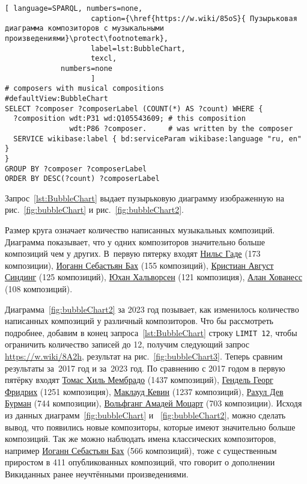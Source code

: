 \begin{lstlisting}[ language=SPARQL, numbers=none,
                    caption={\href{https://w.wiki/85oS}{ Пузырьковая диаграмма композиторов с музыкальными произведениями}\protect\footnotemark},
                    label=lst:BubbleChart,
                    texcl,
	         numbers=none
                    ]
# composers with musical compositions
#defaultView:BubbleChart
SELECT ?composer ?composerLabel (COUNT(*) AS ?count) WHERE {
  ?composition wdt:P31 wd:Q105543609; # this composition
               wdt:P86 ?composer.     # was written by the composer
  SERVICE wikibase:label { bd:serviceParam wikibase:language "ru, en" }
}
GROUP BY ?composer ?composerLabel
ORDER BY DESC(?count) ?composerLabel
\end{lstlisting}%

Запрос~\ref{lst:BubbleChart} выдает пузырьковую диаграмму изображенную на рис.~\ref{fig:bubbleChart} и рис.~\ref{fig:bubbleChart2}.

Размер круга означает количество написанных музыкальных композиций. Диаграмма показывает, что у одних композиторов значительно больше композиций чем у других. В~первую пятерку входят \href{https://ru.wikipedia.org/wiki/Гаде,_Нильс}{Нильс Гаде} (\num{173} композиции), \href{https://ru.wikipedia.org/wiki/Бах,_Иоганн_Себастьян}{Иоганн Себастьян Бах} (\num{155} композиций), \href{https://ru.wikipedia.org/wiki/Синдинг,_Кристиан_Август}{Кристиан Август Синдинг} (\num{125} композиций), \href{https://ru.wikipedia.org/wiki/Хальворсен,_Юхан}{Юхан Хальворсен} (\num{121} композиция), \href{https://ru.wikipedia.org/wiki/Хованесс,_Алан}{Алан Хованесс} (\num{108} композиций).

Диаграмма~\ref{fig:bubbleChart2} за 2023 год позывает, как изменилось количество написанных композиций у различный композиторов. Что бы рассмотреть подробнее, добавим в конец запроса~\ref{lst:BubbleChart} строку  \lstinline|LIMIT 12|, чтобы ограничить количество записей до 12, получим следующий запрос \href{https://w.wiki/8A2h}{https://w.wiki/8A2h}, результат на рис.~\ref{fig:bubbleChart3}. Теперь сравним результаты за~2017 год и за~2023 год.
По сравнению с 2017 годом в первую пятёрку входят \href{https://ca.wikipedia.org/wiki/Tomàs_Gil_i_Membrado}{Томас Хиль Мембрадо} (\num{1437} композиций), \href{https://ru.wikipedia.org/wiki/Гендель,_Георг_Фридрих}{Гендель Георг Фридрих} (\num{1251} композиция), \href{https://ru.wikipedia.org/wiki/Маклауд,_Кевин}{Маклауд Кевин} (\num{1237} композиций), \href{https://en.wikipedia.org/wiki/R._D._Burman}{Рахул Дев Бурман} (\num{744} композиции), \href{https://ru.wikipedia.org/wiki/Моцарт,_Вольфганг_Амадей}{Вольфганг Амадей Моцарт} (\num{703} композиции). Исходя из данных диаграмм~\ref{fig:bubbleChart} и ~\ref{fig:bubbleChart2}, можно сделать вывод, что появились новые композиторы, которые имеют значительно больше композиций. Так же можно наблюдать имена классических композиторов, например \href{https://ru.wikipedia.org/wiki/Бах,_Иоганн_Себастьян}{Иоганн Себастьян Бах} (\num{566} композиций), тоже с существенным приростом в 411 опубликованных композиций, что говорит о дополнении Викиданных ранее неучтёнными произведениями.

